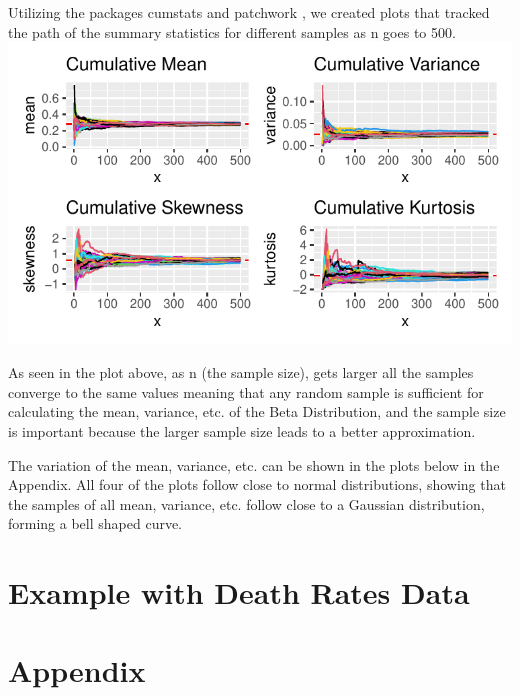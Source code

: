 \documentclass{article}\usepackage[]{graphicx}\usepackage[]{xcolor}
\makeatletter
\def\maxwidth{ %
  \ifdim\Gin@nat@width>\linewidth
    \linewidth
  \else
    \Gin@nat@width
  \fi
}
\newenvironment{knitrout}{}{} %
\makeatother
\begin{document}
\begin{multicols}{2}
Utilizing the packages cumstats \citep{cumstats} and patchwork \citep{patchwork}, we created plots that tracked the path of the summary statistics for different samples as n goes to 500.
\begin{knitrout}
\color{fgcolor}
\includegraphics[width=\maxwidth]{figure/unnamed-chunk-5-1} 
\end{knitrout}

As seen in the plot above, as n (the sample size), gets larger all the samples converge to the same values meaning that any random sample is sufficient for calculating the mean, variance, etc.  of the Beta Distribution, and the sample size is important because the larger sample size leads to a better approximation.

The variation of the mean, variance, etc. can be shown in the plots below in the Appendix.
All four of the plots follow close to normal distributions, showing that the samples of all mean, variance, etc. follow close to a Gaussian distribution, forming a bell shaped curve.

\section{Example with Death Rates Data}




\begin{tiny}

\end{tiny}
\end{multicols}

\newpage

\section{Appendix}
\end{document}
